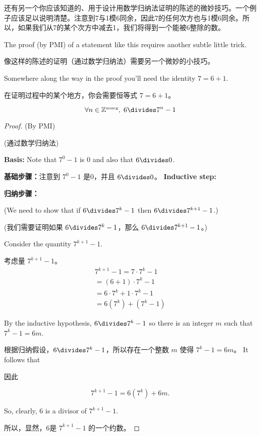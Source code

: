 还有另一个你应该知道的、用于设计用数学归纳法证明的陈述的微妙技巧。一个例子应该足以说明清楚。注意到7与1模6同余，因此7的任何次方也与1模6同余。所以，如果我们从7的某个次方中减去1，我们将得到一个能被6整除的数。

The proof (by PMI) of a statement like this requires another subtle little
trick.

像这样的陈述的证明（通过数学归纳法）需要另一个微妙的小技巧。

Somewhere along the way in the proof you'll need the identity $7=6+1$.

在证明过程中的某个地方，你会需要恒等式 $7=6+1$。

\begin{thm}
\[ \forall n \in \Naturals, \; 6 \divides 7^n-1 \]
\end{thm}

\begin{proof} (By PMI)

(通过数学归纳法)

{\bf Basis:}  Note that $7^0-1$ is $0$ and also that $6 \divides 0$.

{\bf 基础步骤：}注意到 $7^0-1$ 是0，并且 $6 \divides 0$。
{\bf Inductive step:}  

{\bf 归纳步骤：}

\noindent (We need to show that if $6 \divides 7^k-1$ then $6 \divides 7^{k+1}-1$.)

\noindent (我们需要证明如果 $6 \divides 7^k-1$，那么 $6 \divides 7^{k+1}-1$。)

\noindent Consider the quantity $7^{k+1}-1$.

\noindent 考虑量 $7^{k+1}-1$。
\begin{gather*}
7^{k+1}-1 = 7 \cdot 7^k -1 \\
 = (6 + 1) \cdot 7^k - 1 \\
 = 6 \cdot 7^k + 1 \cdot 7^k - 1\\
 = 6(7^k) + (7^k - 1)
\end{gather*}

\noindent By the inductive hypothesis, $6 \divides 7^k - 1$ so there is
an integer $m$ such that $7^k - 1 = 6m$.

\noindent 根据归纳假设，$6 \divides 7^k - 1$，所以存在一个整数 $m$ 使得 $7^k - 1 = 6m$。
It follows that

因此

\[ 7^{k+1}-1 = 6(7^k) + 6m. \]

So, clearly, $6$ is a divisor of $7^{k+1}-1$.

所以，显然，6是 $7^{k+1}-1$ 的一个约数。
\end{proof}

